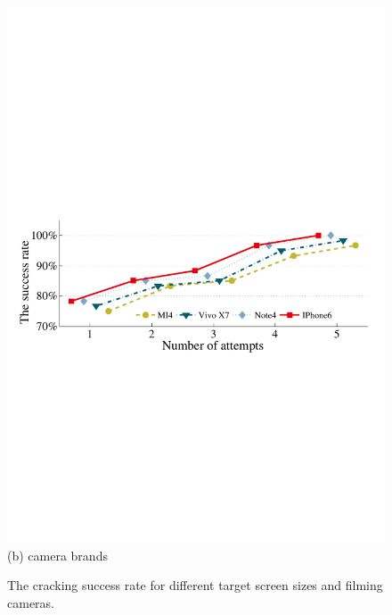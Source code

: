 \begin{figure}[!t]
{\begin{minipage}[t]{0.5\textwidth}
                \includegraphics[width=\textwidth]{fig/camera_brands.pdf}\\
                \centering  (b) camera brands
             \end{minipage}
        }
        \caption{The cracking success rate for different target screen sizes and filming cameras. }
        \label{fig:screen_size}
    \end{figure}

